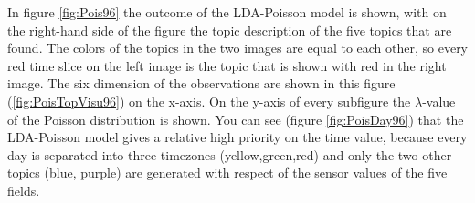 \documentclass[11pt,a4paper]{article}
\begin{document}
In figure \ref{fig:Pois96} the outcome of the LDA-Poisson model is shown, with on the right-hand side of the figure the topic description of the five topics that are found. The colors of the topics in the two images are equal to each other, so every red time slice on the left image is the topic that is shown with red in the right image. The six dimension of the observations are shown in this figure (\ref{fig:PoisTopVisu96}) on the x-axis. On the y-axis of every subfigure the $\lambda$-value of the Poisson distribution is shown. You can see (figure \ref{fig:PoisDay96}) that the LDA-Poisson model gives a relative high priority on the time value, because every day is separated into three timezones (yellow,green,red) and only the two other topics (blue, purple) are generated with respect of the sensor values of the five fields.
\end{document}
